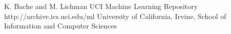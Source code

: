 \documentclass{sig-alternate}
\begin{document}
\begin{thebibliography}{10}

K. Bache and M. Lichman
\newblock UCI Machine Learning Repository
\newblock http://archive.ics.uci.edu/ml
\newblock University of California, Irvine, School of Information and Computer Sciences


\end{thebibliography}
\end{document}
